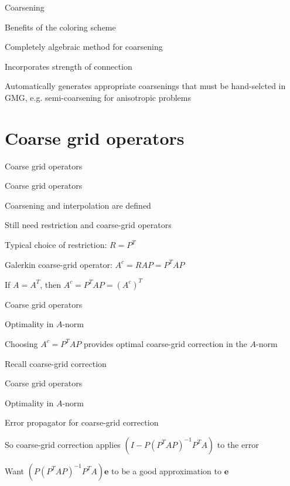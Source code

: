 \documentclass[18pt,xcolor=table]{beamer}
\begin{document}
\begin{frame}{Coarsening}
\begin{block}{Benefits of the coloring scheme}
\bit
\item Completely algebraic method for coarsening
\item Incorporates strength of connection
\item Automatically generates appropriate coarsenings that must be hand-selcted in GMG, e.g. semi-coarsening for anisotropic problems
\eit
\end{block}
\end{frame}


\section{Coarse grid operators}

\begin{frame}{Coarse grid operators}
\begin{block}{Coarse grid operators}
\bit
\item Coarsening and interpolation are defined
\item Still need restriction and coarse-grid operators
\item Typical choice of restriction: $R = P^T$
\item Galerkin coarse-grid operator: $A^c = RAP = P^TAP$
\item If $A = A^T$, then $A^c = P^TAP = (A^c)^T$
\eit
\end{block}
\end{frame}

\begin{frame}{Coarse grid operators}
\begin{block}{Optimality in $A$-norm}
\bit
\item Choosing $A^c = P^TAP$ provides optimal coarse-grid correction in the $A$-norm
\item Recall coarse-grid correction
\eit
{}
\end{block}
\end{frame}

\begin{frame}{Coarse grid operators}
\begin{block}{Optimality in $A$-norm}
\bit
\item Error propagator for coarse-grid correction
\item So coarse-grid correction applies $(I - P(P^TAP)^{-1}P^TA)$ to the error
\item Want $(P(P^TAP)^{-1}P^TA)\mathbf{e}$ to be a good approximation to $\mathbf{e}$
\eit
\end{block}
\end{frame}
\end{document}
